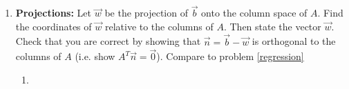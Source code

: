 \begin{enumerate}
\begin{enumerate}
\end{enumerate}



\item {\bf Projections:} \label{projections}Let $\vec w$ be the projection of $\vec b$ onto the column space of $A$.  Find the coordinates of $\vec w$ relative to the columns of $A$. Then state the vector $\vec w$. Check that you are correct by showing that $\vec n = \vec b-\vec w$ is orthogonal to the columns of $A$ (i.e. show $A^T\vec n=\vec 0$). Compare to problem \ref{regression}
\begin{enumerate}
\item 
{}
\end{enumerate}
\end{enumerate}
